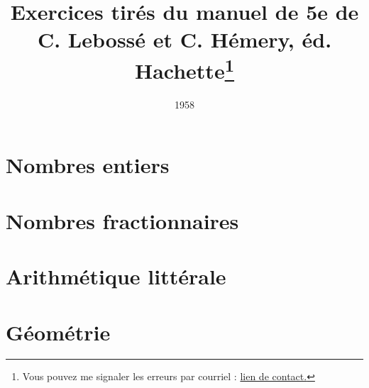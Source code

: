 \documentclass[12 pt]{report}
\author{ }
\title{\Large Exercices tirés du manuel de 5e de C. Lebossé et C. Hémery, éd. Hachette\footnote{Vous pouvez me signaler les erreurs par courriel : \href{mailto:leturcq.d@orange.fr}{lien de contact.} 
	}
	}
\date{1958}
\theoremstyle{plain}
\newcounter{n}
\begin{document}
	\maketitle 
	
	
	
\part{Nombres entiers}
 
 
 
 
 
 
 
 
\part{Nombres fractionnaires}
 
 
 
 
 
 
 
 
\part{Arithmétique littérale}
  
 
 
 
 
\part{Géométrie}
 
 
 
 
 
 
 
 
 
 
 
 
 
 
 
 
 
 	
\end{document}
